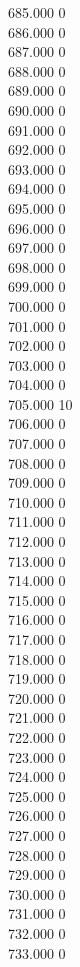 { 685.000	0 \\
 686.000	0 \\
 687.000	0 \\
 688.000	0 \\
 689.000	0 \\
 690.000	0 \\
 691.000	0 \\
 692.000	0 \\
 693.000	0 \\
 694.000	0 \\
 695.000	0 \\
 696.000	0 \\
 697.000	0 \\
 698.000	0 \\
 699.000	0 \\
 700.000	0 \\
 701.000	0 \\
 702.000	0 \\
 703.000	0 \\
 704.000	0 \\
 705.000	10 \\
 706.000	0 \\
 707.000	0 \\
 708.000	0 \\
 709.000	0 \\
 710.000	0 \\
 711.000	0 \\
 712.000	0 \\
 713.000	0 \\
 714.000	0 \\
 715.000	0 \\
 716.000	0 \\
 717.000	0 \\
 718.000	0 \\
 719.000	0 \\
 720.000	0 \\
 721.000	0 \\
 722.000	0 \\
 723.000	0 \\
 724.000	0 \\
 725.000	0 \\
 726.000	0 \\
 727.000	0 \\
 728.000	0 \\
 729.000	0 \\
 730.000	0 \\
 731.000	0 \\
 732.000	0 \\
 733.000	0 \\
}
